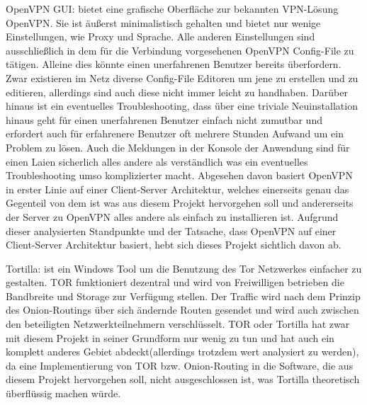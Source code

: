 \documentclass[a4paper,12pt]{scrreprt}
\begin{document}
	OpenVPN GUI: bietet eine grafische Oberfläche zur bekannten VPN-Lösung OpenVPN. Sie ist äußerst minimalistisch gehalten und bietet nur wenige Einstellungen, wie Proxy und Sprache. Alle anderen Einstellungen sind ausschließlich in dem für die Verbindung vorgesehenen OpenVPN Config-File zu tätigen. Alleine dies könnte einen unerfahrenen Benutzer bereits überfordern. Zwar existieren im Netz diverse Config-File Editoren um jene zu erstellen und zu editieren, allerdings sind auch diese nicht immer leicht zu handhaben. Darüber hinaus ist ein eventuelles Troubleshooting, dass über eine triviale Neuinstallation hinaus geht für einen unerfahrenen Benutzer einfach nicht zumutbar und erfordert auch für erfahrenere Benutzer oft mehrere Stunden Aufwand um ein Problem zu lösen. Auch die Meldungen in der Konsole der Anwendung sind für einen Laien sicherlich alles andere als verständlich was ein eventuelles Troubleshooting umso komplizierter macht. Abgesehen davon basiert OpenVPN in erster Linie auf einer Client-Server Architektur, welches einerseits genau das Gegenteil von dem ist was aus diesem Projekt hervorgehen soll und andererseits der Server zu OpenVPN alles andere als einfach zu installieren ist. Aufgrund dieser analysierten Standpunkte und der Tatsache, dass OpenVPN auf einer Client-Server Architektur basiert, hebt sich dieses Projekt sichtlich davon ab.
	
	Tortilla: ist ein Windows Tool um die Benutzung des Tor Netzwerkes einfacher zu gestalten. TOR funktioniert dezentral und wird von Freiwilligen betrieben die Bandbreite und Storage zur Verfügung stellen. Der Traffic wird nach dem Prinzip des Onion-Routings über sich ändernde Routen gesendet und wird auch zwischen den beteiligten Netzwerkteilnehmern verschlüsselt. TOR oder Tortilla hat zwar mit diesem Projekt in seiner Grundform nur wenig zu tun und hat auch ein komplett anderes Gebiet abdeckt(allerdings trotzdem wert analysiert zu werden), da eine Implementierung von TOR bzw. Onion-Routing in die Software, die aus diesem Projekt hervorgehen soll, nicht ausgeschlossen ist, was Tortilla theoretisch überflüssig machen würde. 
	
\end{document}
